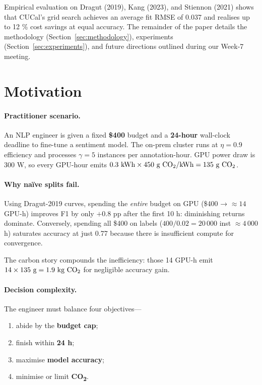 \documentclass[11pt]{article}
\begin{document}
Empirical evaluation on Dragut (2019), Kang (2023), and
Stiennon (2021) shows that CUCal’s grid search achieves an average fit
RMSE of 0.037 and realises up to 12 \% cost savings at equal
accuracy.  
The remainder of the paper details the methodology
(Section~\ref{sec:methodology}), experiments
(Section~\ref{sec:experiments}), and future directions outlined during
our Week-7 meeting.

\section{Motivation}\label{sec:motivation}
\paragraph{Practitioner scenario.}
An NLP engineer is given a fixed \textbf{\$400} budget and a
\textbf{24-hour} wall-clock deadline to fine-tune a sentiment model.
The on-prem cluster runs at
$\eta = 0.9$ efficiency and processes
$\gamma = 5$ instances per annotation-hour.
GPU power draw is 300 W, so every GPU-hour emits
$0.3\text{ kWh}\times 450\text{ g CO\textsubscript{2}/kWh}
 = 135\text{ g CO\textsubscript{2}}$.

\paragraph{Why naïve splits fail.}
Using Dragut-2019 curves, spending the \emph{entire} budget on GPU
(\$400 → $\approx14$ GPU-h) improves F1 by only
$+0.8$ pp after the first 10 h:
diminishing returns dominate.
Conversely, spending all \$400 on labels
($400/0.02 = 20\,000$ inst $\approx4\,000$ h)
saturates accuracy at just 0.77 because there is
insufficient compute for convergence.

The carbon story compounds the inefficiency:
those 14 GPU-h emit
$14\times135\text{ g}=1.9\text{ kg CO\textsubscript{2}}$
for negligible accuracy gain.

\paragraph{Decision complexity.}
The engineer must balance four objectives—
\begin{enumerate}
  \item abide by the \textbf{budget cap};
  \item finish within \textbf{24 h};
  \item maximise \textbf{model accuracy};
  \item minimise or limit \textbf{CO\textsubscript{2}}.
\end{enumerate}
\end{document}
